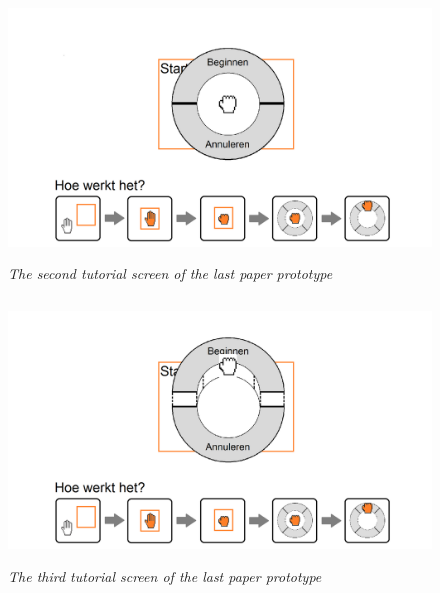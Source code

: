 \begin{figure}[H]
	\begin{center}
		\includegraphics[width=12.5cm, height=7cm]{figures/prototype_8_6_tutorial_2.png}
		\caption{\emph{The second tutorial screen of the last paper prototype}}
		\label{second tutorial last prototype}
	\end{center}
\end{figure}

\begin{figure}[H]
	\begin{center}
		\includegraphics[width=12.5cm, height=7cm]{figures/prototype_9_6_tutorial_3.png}
		\caption{\emph{The third tutorial screen of the last paper prototype}}
		\label{third tutorial last prototype}
	\end{center}
\end{figure}

